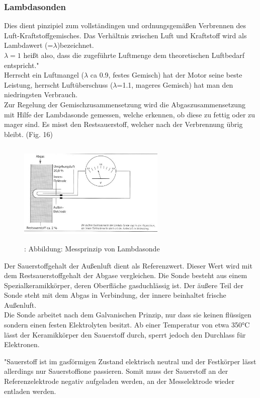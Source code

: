 			\subsubsection{Lambdasonden}
				Dies dient pinzipiel zum vollständingen und ordnungsgemäßen Verbrennen des Luft-Kraftstoffgemisches. Das Verhältnis zwischen Luft und Kraftstoff wird als Lambdawert (=$\lambda$)bezeichnet.\\
				$\lambda = 1$ heißt also, dass die zugeführte Luftmenge dem theoretischen Luftbedarf entspricht."\cite{TS_lambda}\\
				Herrscht ein Luftmangel ($\lambda$ ca 0.9, festes Gemisch) hat der Motor seine beste Leistung, herrscht Luftüberschuss ($\lambda$=1.1, mageres Gemisch) hat man den niedringsten Verbrauch.\\
				Zur Regelung der Gemischzusammensetzung wird die Abgaszusammensetzung mit Hilfe der Lambdasonde gemessen, welche erkennen, ob diese zu fettig oder zu mager sind. Es misst den Restsauerstoff, welcher nach der Verbrennung übrig bleibt. (Fig. 16)		
			
				\begin{figure}
					\includegraphics[width=7cm, height=5cm] {lambdasonde.png}
					\caption {\cite{TS_lambda_pic}: Abbildung: Messprinzip von Lambdasonde}
				\end{figure}
			
					Der Sauerstoffgehalt der Außenluft dient als Referenzwert. Dieser Wert wird mit dem Restsauerstoffgehalt der Abgase vergleichen. Die Sonde besteht aus einem Spezialkeramikkörper, deren Oberfläche gasduchlässig ist. Der äußere Teil der Sonde steht mit dem Abgas in Verbindung, der innere beinhaltet frische Außenluft.\\
					Die Sonde arbeitet nach dem Galvanischen Prinzip, nur dass sie keinen flüssigen sondern einen festen Elektrolyten besitzt. Ab einer Temperatur von etwa 350°C lässt der Keramikkörper den Sauerstoff durch, sperrt jedoch den Durchlass für Elektronen.
					
					"Sauerstoff ist im gasförmigen Zustand elektrisch neutral und der Festkörper lässt allerdings nur Sauerstoffione passieren. Somit muss der Sauerstoff an der Referenzelektrode negativ aufgeladen werden, an der Messelektrode wieder entladen werden.
					
